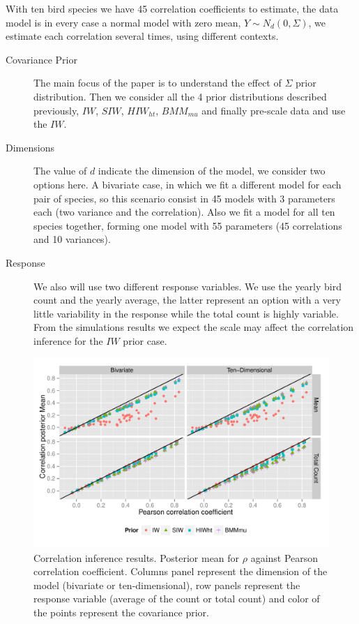 \documentclass{article}
\begin{document}
With ten bird species we have 45 correlation coefficients to estimate, the data model is in every case a normal model with zero mean, $Y \sim N_d(0, \Sigma)$, we estimate each correlation several times, using different contexts. 

\begin{description}
\item[Covariance Prior] The main focus of the paper is to understand the effect of  $\Sigma$ prior distribution. Then we consider all the 4 prior distributions described previously, $IW$, $SIW$, $HIW_{ht}$, $BMM_{mu}$ and finally pre-scale data and use the $IW$. 

\item[ Dimensions] The value of $d$ indicate the dimension of the model, we consider two options here. A bivariate case, in which we fit a different model for each pair of species, so this scenario consist in 45 models with 3 parameters each (two variance and the correlation). Also we fit a model for all ten species together, forming one model with 55 parameters (45 correlations and 10 variances). 

\item[Response] We also will use two different response variables. We use the yearly bird count and the yearly average, the latter represent an option with a very little variability in the response while the total count is highly variable. From the simulations results we expect the scale may affect the correlation inference for the $IW$ prior case. 
\end{description}

\begin{figure}[hbpt]
\centering
\includegraphics[width=\textwidth]{rescorr}
 \vspace{-.5in}
\caption{Correlation inference results. Posterior mean for $\rho$  against Pearson correlation coefficient. 
Columns panel represent the dimension of the model (bivariate or ten-dimensional), row panels represent the response variable (average of the count or total count)  and color of the points represent the covariance prior. \label{fig:coring}  }
\end{figure}
\end{document}
